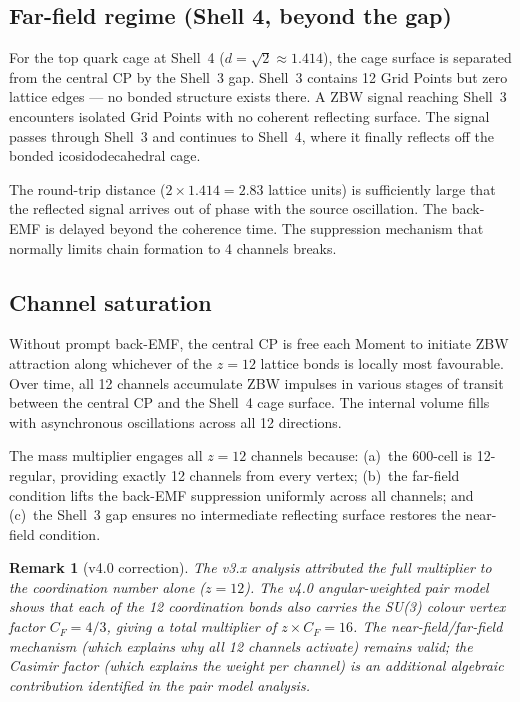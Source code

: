 \documentclass[11pt,letterpaper]{article}
\newtheorem{remark}[theorem]{Remark}
\begin{document}
\subsection{Far-field regime (Shell 4, beyond the gap)}

For the top quark cage at Shell~4 ($d = \sqrt{2} \approx 1.414$),
the cage surface is separated from the central CP by the Shell~3
gap.  Shell~3 contains 12 Grid Points but zero lattice edges ---
no bonded structure exists there.  A ZBW signal reaching Shell~3
encounters isolated Grid Points with no coherent reflecting surface.
The signal passes through Shell~3 and continues to Shell~4, where
it finally reflects off the bonded icosidodecahedral cage.

The round-trip distance ($2 \times 1.414 = 2.83$ lattice units) is
sufficiently large that the reflected signal arrives out of phase
with the source oscillation.  The back-EMF is delayed beyond the
coherence time.  The suppression mechanism that normally limits chain
formation to 4 channels breaks.

\subsection{Channel saturation}

Without prompt back-EMF, the central CP is free each Moment to
initiate ZBW attraction along whichever of the $z = 12$ lattice
bonds is locally most favourable.  Over time, all 12 channels
accumulate ZBW impulses in various stages of transit between the
central CP and the Shell~4 cage surface.  The internal volume fills
with asynchronous oscillations across all 12 directions.

The mass multiplier engages all $z = 12$ channels because:
(a)~the 600-cell is 12-regular, providing exactly 12 channels from
every vertex; (b)~the far-field condition lifts the back-EMF
suppression uniformly across all channels; and (c)~the Shell~3 gap
ensures no intermediate reflecting surface restores the near-field
condition.

\begin{remark}[v4.0 correction]
The v3.x analysis attributed the full multiplier to the
coordination number alone ($z = 12$).  The v4.0 angular-weighted
pair model shows that each of the 12 coordination bonds also
carries the SU(3) colour vertex factor $C_F = 4/3$, giving a total
multiplier of $z \times C_F = 16$.  The near-field/far-field
mechanism (which explains \emph{why} all 12 channels activate)
remains valid; the Casimir factor (which explains the
\emph{weight per channel}) is an additional algebraic contribution
identified in the pair model analysis.
\end{remark}
\end{document}
